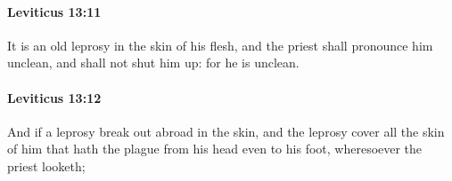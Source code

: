 		\paragraph{Leviticus 13:11} %
			\label{LEVITICUS-13-11}

			It is an old leprosy in the skin of his flesh, and the priest shall pronounce him unclean, and shall not shut him up: for he is unclean.


		\paragraph{Leviticus 13:12} %
			\label{LEVITICUS-13-12}

			And if a leprosy break out abroad in the skin, and the leprosy cover all the skin of him that hath the plague from his head even to his foot, wheresoever the priest looketh;


